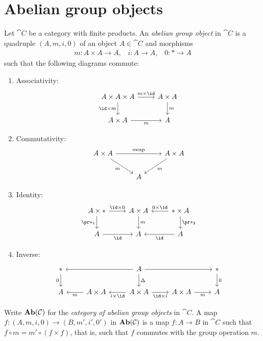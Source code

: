 \documentclass[../main.tex]{subfiles}
\begin{document}
\section{Abelian group objects}
\noindent
\begin{defn}
    Let $\cat C$ be a category with finite products. An \emph{abelian group object} in $\cat C$ is a quadruple $(A, m, i, 0)$ of an object $A\in \cat C$ and morphisms
    \begin{align*}
        m\colon A\times A\to A\text{,} \quad i\colon A\to A\text{,} \quad 0\colon * \to A
    \end{align*}
    such that the following diagrams commute:
    \begin{enumerate}
        \item Associativity:
            \[\begin{tikzcd}
            A\times A\times A \arrow[r, "m\times \id"] \arrow[d, "\id\times m"'] & A\times A \arrow[d, "m"] \\
            A\times A \arrow[r, "m"']                                            & A                       
            \end{tikzcd}\]
        \item Commutativity:
            \[\begin{tikzcd}
            A\times A \arrow[rd, "m"'] \arrow[rr, "\operatorname{swap}"] &   & A\times A \arrow[ld, "m"] \\ 
            & A & 
            \end{tikzcd}\]
        \item Identity:
            \[\begin{tikzcd}
            A\times * \arrow[r, "\id\times 0"] \arrow[d, "\pr*_1"'] & A\times A \arrow[d, "m"] & *\times A \arrow[l, "0\times\id"'] \arrow[d, "\pr*_2"] \\
            A \arrow[r, "\id"']                                          & A                        & A \arrow[l, "\id"]                                        
            \end{tikzcd}\]
        \item Inverse:
            \[\begin{tikzcd}
            * \arrow[d, "0"'] &                           & A \arrow[d, "\Delta"] \arrow[rr] \arrow[ll]                           &                          & * \arrow[d, "0"] \\
            A                & A\times A \arrow[l, "m"] & A\times A \arrow[r, "\id \times i"'] \arrow[l, "i\times \id"] & A\times A \arrow[r, "m"'] & A               
            \end{tikzcd}\]
    \end{enumerate}
    Write $\mathbf{Ab}(\mathcal{C})$ for the \emph{category of abelian group objects} in $\cat C$.
    A map \(f\colon(A,m,i,0)\to (B,m',i',0')\) in \(\mathbf{Ab}(\mathcal{C})\) is a map \(f\colon A\to B\) in \(\cat C\) such that \(f\circ m=m'\circ(f\times f)\), that is, such that \(f\) commutes with the group operation \(m\).
\end{defn}
\end{document}
